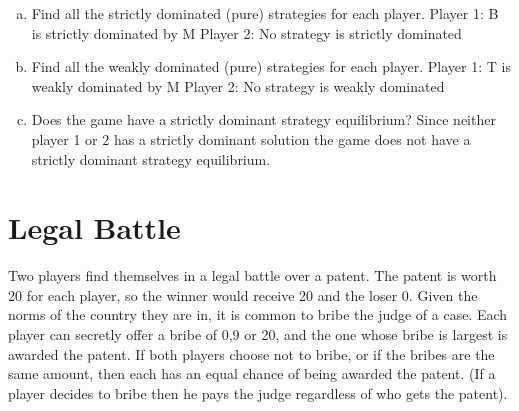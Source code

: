 \documentclass{article}
\begin{document}
\begin{enumerate}[(a)]
\item Find all the strictly dominated (pure) strategies for each player.
\newline
Player 1: B is strictly dominated by M
\newline
Player 2: No strategy is strictly dominated
\item Find all the weakly dominated (pure) strategies for each player.
\newline
Player 1: T is weakly dominated by M
\newline
Player 2: No strategy is weakly dominated

\item Does the game have a strictly dominant strategy equilibrium?
\newline
Since neither player 1 or 2 has a strictly dominant solution the game does not have a strictly dominant strategy equilibrium.
\end{enumerate}


\pagebreak
\section{Legal Battle}
Two players find themselves in a legal battle over a patent.
The patent is worth 20 for each player, so the winner would receive 20 and the loser 0.
Given the norms of the country they are in, it is common to bribe the judge of a case.
Each player can secretly offer a bribe of 0,9 or 20, and the one whose bribe is largest is awarded the patent.
If both players choose not to bribe, or if the bribes are the same amount, then each has an equal chance of being awarded the patent.
(If a player decides to bribe then he pays the judge regardless of who gets the patent).
\end{document}
